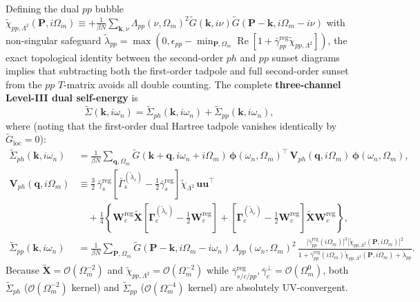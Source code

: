 \documentclass[11pt,a4paper]{article}
\numberwithin{equation}{section}
\theoremstyle{plain}
\theoremstyle{definition}
\providecommand{\vk}{\mathbf{k}}
\providecommand{\vq}{\mathbf{q}}
\providecommand{\vP}{\mathbf{P}}
\providecommand{\re}{\operatorname{Re}}
\begin{document}
Defining the dual $pp$ bubble
$\tilde{\chi}_{pp,\Lambda^2}(\vP,i\Omega_m) \equiv +\frac{1}{\beta N}\sum_{\vk,\nu}\Lambda_{pp}(\nu,\Omega_m)^2\tilde{G}(\vk,i\nu)\tilde{G}(\vP-\vk,i\Omega_m-i\nu)$
with non-singular safeguard
$\tilde{\lambda}_{pp} = \max(0,\epsilon_{pp} - \min_{\vP,\Omega_m}\re[1 + \bar{\gamma}_{pp}^{\mathrm{reg}}\tilde{\chi}_{pp,\Lambda^2}])$,
the exact topological identity between the second-order $ph$ and $pp$ sunset diagrams
implies that subtracting both the first-order tadpole and full second-order sunset from
the $pp$ $T$-matrix avoids all double counting. The complete \textbf{three-channel
Level-III dual self-energy} is
\begin{equation}
    \tilde{\Sigma}(\vk,i\omega_n)
    = \tilde{\Sigma}_{ph}(\vk,i\omega_n) + \tilde{\Sigma}_{pp}(\vk,i\omega_n),
    \label{eq:Sigma_dual_3ch}
\end{equation}
where (noting that the first-order dual Hartree tadpole vanishes identically by
$\tilde{G}_{\mathrm{loc}} = 0$):
\begin{align}
    \tilde{\Sigma}_{ph}(\vk,i\omega_n)
    &= \frac{1}{\beta N} \sum_{\vq,\Omega_m}
       \tilde{G}(\vk+\vq, i\omega_n+i\Omega_m)\,
       \boldsymbol{\phi}(\omega_n,\Omega_m)^\top\,
       \mathbf{V}_{ph}(\vq,i\Omega_m)\,
       \boldsymbol{\phi}(\omega_n,\Omega_m),
    \label{eq:Sigma_ph_mat} \\
    \mathbf{V}_{ph}(\vq,i\Omega_m)
    &\equiv \frac{3}{2}\,\bar{\gamma}_s^{\mathrm{reg}}
            \left[\bar{\Gamma}_s^{(\tilde{\lambda}_s)} - \frac{1}{2}\bar{\gamma}_s^{\mathrm{reg}}\right]
            \tilde{\chi}_{\Lambda^2}\, \mathbf{u}\mathbf{u}^\top \nonumber \\
    &\quad + \frac{1}{4}\left\{
            \mathbf{W}_c^{\mathrm{reg}}\tilde{\mathbf{X}}
            \left[\mathbf{\Gamma}_c^{(\tilde{\lambda}_c)} - \frac{1}{2}\mathbf{W}_c^{\mathrm{reg}}\right]
            + \left[\mathbf{\Gamma}_c^{(\tilde{\lambda}_c)} - \frac{1}{2}\mathbf{W}_c^{\mathrm{reg}}\right]
              \tilde{\mathbf{X}}\mathbf{W}_c^{\mathrm{reg}}
            \right\},
    \label{eq:V_ph_mat} \\
    \tilde{\Sigma}_{pp}(\vk,i\omega_n)
    &= \frac{1}{\beta N} \sum_{\vP,\Omega_m}
       \tilde{G}(\vP-\vk, i\Omega_m - i\omega_n)\,
       \Lambda_{pp}(\omega_n,\Omega_m)^2\,
       \frac{\bigl[\bar{\gamma}_{pp}^{\mathrm{reg}}(i\Omega_m)\bigr]^3
             \bigl[\tilde{\chi}_{pp,\Lambda^2}(\vP,i\Omega_m)\bigr]^2}
            {1 + \bar{\gamma}_{pp}^{\mathrm{reg}}(i\Omega_m)\tilde{\chi}_{pp,\Lambda^2}(\vP,i\Omega_m) + \tilde{\lambda}_{pp}}.
    \label{eq:Sigma_pp}
\end{align}
Because $\tilde{\mathbf{X}} = \mathcal{O}(\Omega_m^{-2})$ and
$\tilde{\chi}_{pp,\Lambda^2} = \mathcal{O}(\Omega_m^{-2})$ while
$\bar{\gamma}_{s/c/pp}^{\mathrm{reg}}, \bar{\gamma}_c^\perp = \mathcal{O}(\Omega_m^0)$,
both $\tilde{\Sigma}_{ph}$ ($\mathcal{O}(\Omega_m^{-2})$ kernel) and
$\tilde{\Sigma}_{pp}$ ($\mathcal{O}(\Omega_m^{-4})$ kernel) are absolutely
UV-convergent.
\end{document}
